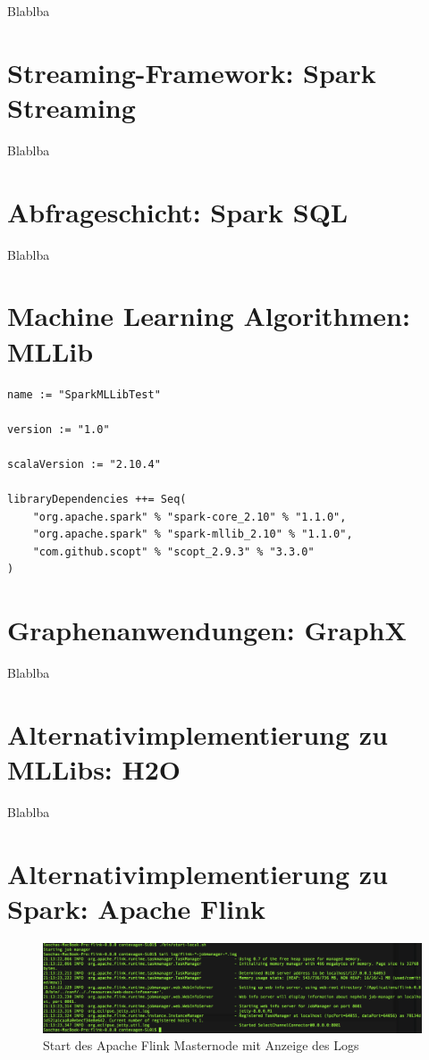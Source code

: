 Blablba

\section{Streaming-Framework: Spark Streaming}
\label{section:streaming}

Blablba

\section{Abfrageschicht: Spark SQL}
\label{section:spark sql}

Blablba

\section{Machine Learning Algorithmen: MLLib}
\label{section:mllib arch}

\begin{lstlisting}[label=setup mllibs,caption=SBT Script für Anwendungen mit Spark und MLLib-Dependencies]
name := "SparkMLLibTest"

version := "1.0"

scalaVersion := "2.10.4"

libraryDependencies ++= Seq(
    "org.apache.spark" % "spark-core_2.10" % "1.1.0",
    "org.apache.spark" % "spark-mllib_2.10" % "1.1.0",
    "com.github.scopt" % "scopt_2.9.3" % "3.3.0"
)

\end{lstlisting}




\section{Graphenanwendungen: GraphX}
\label{section:graphx}

Blablba


\section{Alternativimplementierung zu MLLibs: H2O}
\label{section:h2o}

Blablba

\section{Alternativimplementierung zu Spark: Apache Flink}
\label{section:flink}

\begin{figure}[htb!]
\centering
\includegraphics[width=1.0\textwidth]{bilder/flink1.png}
\caption{Start des Apache Flink Masternode mit Anzeige des Logs }
\label{fig:flink start]}
\end{figure} 



